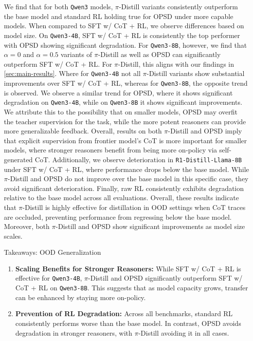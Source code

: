 \documentclass[]{servicenow} %
\begin{document}
We find that for both \texttt{Qwen3} models, $\pi$-Distill variants consistently outperform the base model and standard RL holding true for OPSD under more capable models. When compared to SFT w/ CoT + RL, we observe differences based on model size. On \texttt{Qwen3-4B}, SFT w/ CoT + RL is consistently the top performer with OPSD showing significant degradation. For \texttt{Qwen3-8B}, however, we find that $\alpha=0$ and $\alpha=0.5$ variants of $\pi$-Distill as well as OPSD can significantly outperform SFT w/ CoT + RL. For $\pi$-Distill, this aligns with our findings in \cref{sec:main-results}. Where for \texttt{Qwen3-4B} not all $\pi$-Distill variants show substantial improvements over SFT w/ CoT + RL, whereas for \texttt{Qwen3-8B}, the opposite trend is observed. We observe a similar trend for OPSD, where it shows significant degradation on \texttt{Qwen3-4B}, while on \texttt{Qwen3-8B} it shows significant improvements. We attribute this to the possibility that on smaller models, OPSD may overfit the teacher supervision for the task, while the more potent reasoners can provide more generalizable feedback. Overall, results on both $\pi$-Distill and OPSD imply that explicit supervision from frontier model's CoT is more important for smaller models, where stronger reasoners benefit from being more on-policy via self-generated CoT. Additionally, we observe deterioration in \texttt{R1-Distill-Llama-8B} under SFT w/ CoT + RL, where performance drops below the base model. While $\pi$-Distill and OPSD do not improve over the base model in this specific case, they avoid significant deterioration. Finally, raw RL consistently exhibits degradation relative to the base model across all evaluations. Overall, these results indicate that $\pi$-Distill is highly effective for distillation in OOD settings when CoT traces are occluded, preventing performance from regressing below the base model. Moreover, both $\pi$-Distill and OPSD show significant improvements as model size scales.
\begin{finding}{Takeaways: OOD Generalization}
    \begin{enumerate}
        \item \textbf{Scaling Benefits for Stronger Reasoners:} While SFT w/ CoT + RL is effective for \texttt{Qwen3-4B}, $\pi$-Distill and OPSD significantly outperform SFT w/ CoT + RL on \texttt{Qwen3-8B}. This suggests that as model capacity grows, transfer can be enhanced by staying more on-policy.
        \item \textbf{Prevention of RL Degradation:} Across all benchmarks, standard RL consistently performs worse than the base model. In contrast, OPSD avoids degradation
        in stronger reasoners, with $\pi$-Distill avoiding it in all cases.
    \end{enumerate}
\end{finding}
\end{document}

